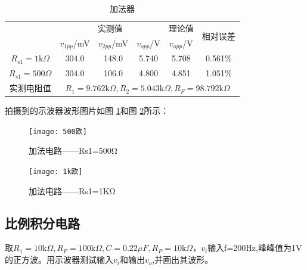 \documentclass[a4paper]{article}
\theoremstyle{definition}
\theoremstyle{plain}
\theoremstyle{remark}
\newcommand{\reffig}[1]{图 \ref{#1}}
\begin{document}
\begin{table}[H]
	\center
	\large
	\begin{tabular}{|c|ccccc|}
		\hline
		                                  & \multicolumn{3}{c|}{实测值}                                                                                & \multicolumn{1}{c|}{理论值} & \multirow{2}{*}{相对误差} \\ \cline{1-5}
		                                  &
		\multicolumn{1}{c|}{$v_{1pp}$/mV} &
		\multicolumn{1}{c|}{$v_{2pp}$/mV} &
		\multicolumn{1}{c|}{$v_{opp}$/V}  &
		\multicolumn{1}{c|}{$v_{opp}$/V}  &
		\\ \hline
		$R_{s1}=1\mathrm{k}\Omega$        &
		\multicolumn{1}{c|}{304.0}        &
		\multicolumn{1}{c|}{148.0}        &
		\multicolumn{1}{c|}{5.740}        &
		\multicolumn{1}{c|}{5.708}        &
		0.561\%                                                                                                                                                                                        \\ \hline
		$R_{s1}=500\Omega$                &
		\multicolumn{1}{c|}{304.0}        &
		\multicolumn{1}{c|}{106.0}        &
		\multicolumn{1}{c|}{4.800}        &
		\multicolumn{1}{c|}{4.851}        &
		1.051\%                                                                                                                                                                                        \\ \hline
		实测电阻值                             & \multicolumn{5}{c|}{$R_1=9.762\mathrm{k}\Omega,R_2=5.043 \mathrm{k}\Omega,R_F=98.792 \mathrm{k}\Omega$}                                                    \\ \hline
	\end{tabular}
	\caption{加法器}
	\label{加法器}
\end{table}
拍摄到的示波器波形图片如\reffig{加法电路——Rs1=500Ω}和\reffig{加法电路——Rs1=1KΩ}所示：

\begin{figure}[H]
	\centering
	\texttt{[image: 500欧]}
	\caption{加法电路——Rs1=500Ω}
	\label{加法电路——Rs1=500Ω}
\end{figure}

\begin{figure}[H]
	\centering
	\texttt{[image: 1k欧]}
	\caption{加法电路——Rs1=1KΩ}
	\label{加法电路——Rs1=1KΩ}
\end{figure}



\subsection{比例积分电路}
取$ R_1=10\mathrm{k}\Omega,R_F=100\mathrm{k}\Omega,C=0.22μF,R_P= 10\mathrm{k}\Omega$，$v_i$输入f=200Hz,峰峰值为1V的正方波。用示波器测试输入$v_i$和输出$v_o$,并画出其波形。
\end{document}
